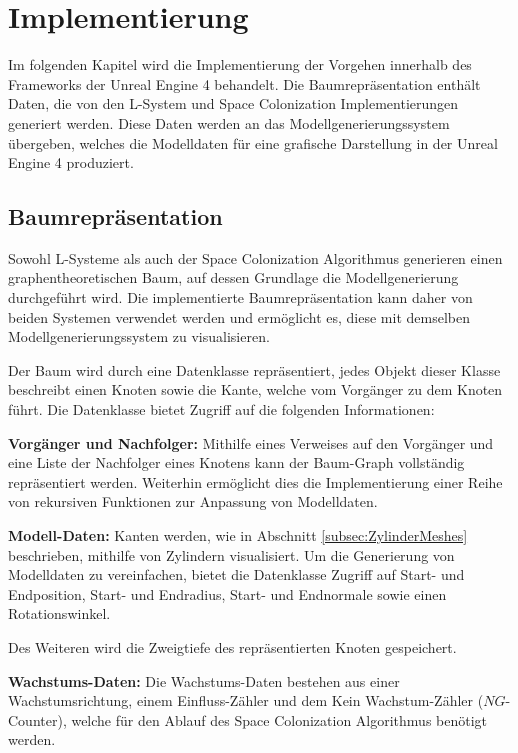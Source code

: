 \chapter{Implementierung} \label{ch:Implementierung}


Im folgenden Kapitel wird die Implementierung der Vorgehen innerhalb des Frameworks der Unreal Engine 4 behandelt. Die Baumrepräsentation enthält Daten, die von den L-System und Space Colonization Implementierungen generiert werden. Diese Daten werden an das Modellgenerierungssystem übergeben, welches die Modelldaten für eine grafische Darstellung in der Unreal Engine 4 produziert.


\section{Baumrepräsentation}  \label{sec:ImplementierungBaumrep}

Sowohl L-Systeme als auch der Space Colonization Algorithmus generieren einen graphentheoretischen Baum, auf dessen Grundlage die Modellgenerierung durchgeführt wird. Die implementierte Baumrepräsentation kann daher von beiden Systemen verwendet werden und ermöglicht es, diese mit demselben Modellgenerierungssystem zu visualisieren.

Der Baum wird durch eine Datenklasse repräsentiert, jedes Objekt dieser Klasse beschreibt einen Knoten sowie die Kante, welche vom Vorgänger zu dem Knoten führt. Die Datenklasse bietet Zugriff auf die folgenden Informationen:

\begin{description}
	\item \textbf{Vorgänger und Nachfolger:} Mithilfe eines Verweises auf den Vorgänger und eine Liste der Nachfolger eines Knotens kann der Baum-Graph vollständig repräsentiert werden. Weiterhin ermöglicht dies die Implementierung einer Reihe von rekursiven Funktionen zur Anpassung von Modelldaten.\\
	
	\item \textbf{Modell-Daten:} Kanten werden, wie in Abschnitt \ref{subsec:ZylinderMeshes} beschrieben, mithilfe von Zylindern visualisiert. Um die Generierung von Modelldaten zu vereinfachen, bietet die Datenklasse Zugriff auf Start- und Endposition, Start- und Endradius, Start- und Endnormale sowie einen Rotationswinkel. 
	
	Des Weiteren wird die Zweigtiefe des repräsentierten Knoten gespeichert.\\
	
	\item \textbf{Wachstums-Daten:} Die Wachstums-Daten bestehen aus einer Wachstumsrichtung, einem Einfluss-Zähler und dem \glqq Kein Wachstum\grqq-Zähler ($NG$-Counter), welche für den Ablauf des Space Colonization Algorithmus benötigt werden.	
\end{description}

